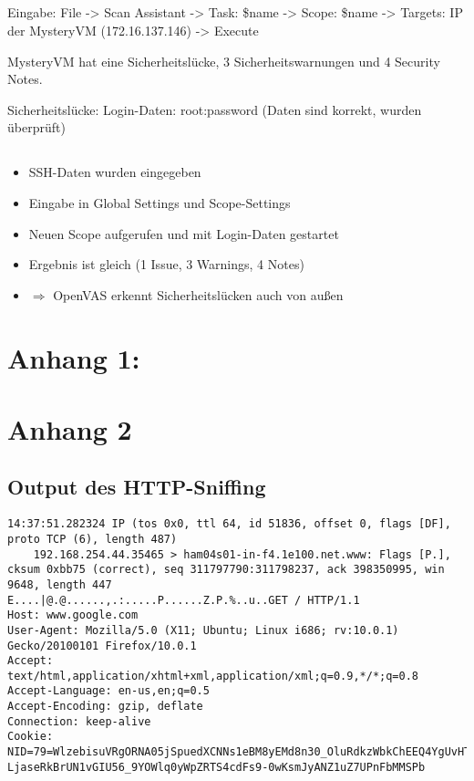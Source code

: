 \documentclass[twoside]{article}
\begin{document}
\subsection{}
Eingabe: File -> Scan Assistant -> Task: \$name -> Scope: \$name -> Targets: IP der MysteryVM (172.16.137.146) -> Execute

MysteryVM hat eine Sicherheitslücke, 3 Sicherheitswarnungen und 4 Security Notes.

Sicherheitslücke: Login-Daten: root:password (Daten sind korrekt, wurden überprüft)
\subsection{}
\begin{itemize}
	\item SSH-Daten wurden eingegeben
	\item Eingabe in Global Settings und Scope-Settings
	\item Neuen Scope aufgerufen und mit Login-Daten gestartet
	\item Ergebnis ist gleich (1 Issue, 3 Warnings, 4 Notes)
	\item $\Rightarrow$ OpenVAS erkennt Sicherheitslücken auch von außen
\end{itemize}

\newpage
\section*{Anhang 1:}


\section*{Anhang 2}
\subsection*{Output des HTTP-Sniffing}
\begin{lstlisting}
14:37:51.282324 IP (tos 0x0, ttl 64, id 51836, offset 0, flags [DF], proto TCP (6), length 487)
    192.168.254.44.35465 > ham04s01-in-f4.1e100.net.www: Flags [P.], cksum 0xbb75 (correct), seq 311797790:311798237, ack 398350995, win 9648, length 447
E....|@.@......,.:.....P......Z.P.%..u..GET / HTTP/1.1
Host: www.google.com
User-Agent: Mozilla/5.0 (X11; Ubuntu; Linux i686; rv:10.0.1) Gecko/20100101 Firefox/10.0.1
Accept: text/html,application/xhtml+xml,application/xml;q=0.9,*/*;q=0.8
Accept-Language: en-us,en;q=0.5
Accept-Encoding: gzip, deflate
Connection: keep-alive
Cookie: NID=79=WlzebisuVRgORNA05jSpuedXCNNs1eBM8yEMd8n30_OluRdkzWbkChEEQ4YgUvHTWB3a64hs LjaseRkBrUN1vGIU56_9YOWlq0yWpZRTS4cdFs9-0wKsmJyANZ1uZ7UPnFbMMSPb
\end{lstlisting}
\end{document}
